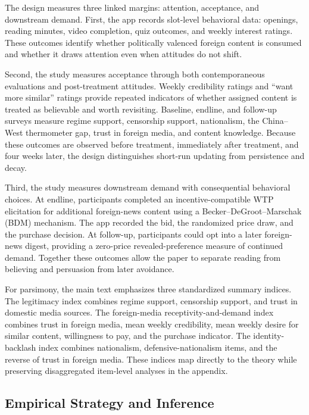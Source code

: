 \documentclass[12pt,american]{article}
\begin{document}
The design measures three linked margins: attention, acceptance, and downstream demand. First, the app records slot-level behavioral data: openings, reading minutes, video completion, quiz outcomes, and weekly interest ratings. These outcomes identify whether politically valenced foreign content is consumed and whether it draws attention even when attitudes do not shift.
	
Second, the study measures acceptance through both contemporaneous evaluations and post-treatment attitudes. Weekly credibility ratings and ``want more similar'' ratings provide repeated indicators of whether assigned content is treated as believable and worth revisiting. Baseline, endline, and follow-up surveys measure regime support, censorship support, nationalism, the China--West thermometer gap, trust in foreign media, and content knowledge. Because these outcomes are observed before treatment, immediately after treatment, and four weeks later, the design distinguishes short-run updating from persistence and decay.
	
Third, the study measures downstream demand with consequential behavioral choices. At endline, participants completed an incentive-compatible WTP elicitation for additional foreign-news content using a Becker--DeGroot--Marschak (BDM) mechanism. The app recorded the bid, the randomized price draw, and the purchase decision. At follow-up, participants could opt into a later foreign-news digest, providing a zero-price revealed-preference measure of continued demand. Together these outcomes allow the paper to separate reading from believing and persuasion from later avoidance.
	
For parsimony, the main text emphasizes three standardized summary indices. The legitimacy index combines regime support, censorship support, and trust in domestic media sources. The foreign-media receptivity-and-demand index combines trust in foreign media, mean weekly credibility, mean weekly desire for similar content, willingness to pay, and the purchase indicator. The identity-backlash index combines nationalism, defensive-nationalism items, and the reverse of trust in foreign media. These indices map directly to the theory while preserving disaggregated item-level analyses in the appendix.
	
	\subsection*{Empirical Strategy and Inference}
	
\end{document}
